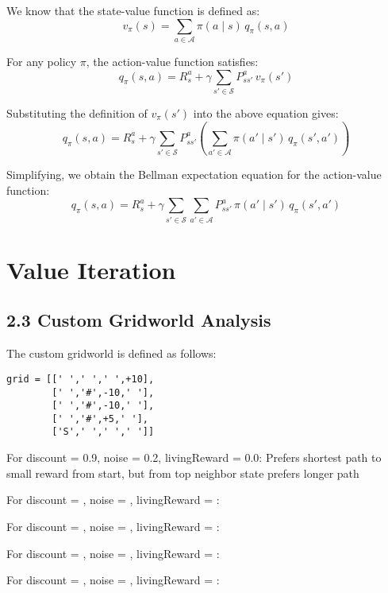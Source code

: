 \documentclass[11pt]{article}
\begin{document}
We know that the state-value function is defined as:
\[
v_{\pi}(s) = \sum_{a \in \mathcal{A}} \pi(a \mid s) \, q_{\pi}(s,a)
\]

For any policy $\pi$, the action-value function satisfies:
\[
q_{\pi}(s,a)
= R_s^a + \gamma \sum_{s' \in \mathcal{S}} P_{ss'}^a \, v_{\pi}(s')
\]

Substituting the definition of $v_{\pi}(s')$ into the above equation gives:
\[
q_{\pi}(s,a)
= R_s^a + \gamma \sum_{s' \in \mathcal{S}} P_{ss'}^a 
   \left( \sum_{a' \in \mathcal{A}} \pi(a' \mid s') \, q_{\pi}(s',a') \right)
\]

Simplifying, we obtain the Bellman expectation equation for the action-value function:
\[
\boxed{
q_{\pi}(s,a)
= R_s^a + \gamma \sum_{s' \in \mathcal{S}} \sum_{a' \in \mathcal{A}} 
      P_{ss'}^a \, \pi(a' \mid s') \, q_{\pi}(s',a')
}
\]

\section{Value Iteration}

\subsection{2.3 Custom Gridworld Analysis}

The custom gridworld is defined as follows:

\begin{verbatim}
grid = [[' ',' ',' ',+10],
        [' ','#',-10,' '],
        [' ','#',-10,' '],
        [' ','#',+5,' '],
        ['S',' ',' ',' ']]
\end{verbatim}

\noindent For discount = 0.9, noise = 0.2, livingReward = 0.0: Prefers shortest path to small reward from start, but from top neighbor state prefers longer path

\noindent For discount = , noise = , livingReward = : 

\noindent For discount = , noise = , livingReward = : 

\noindent For discount = , noise = , livingReward = : 

\noindent For discount = , noise = , livingReward = :
\end{document}
